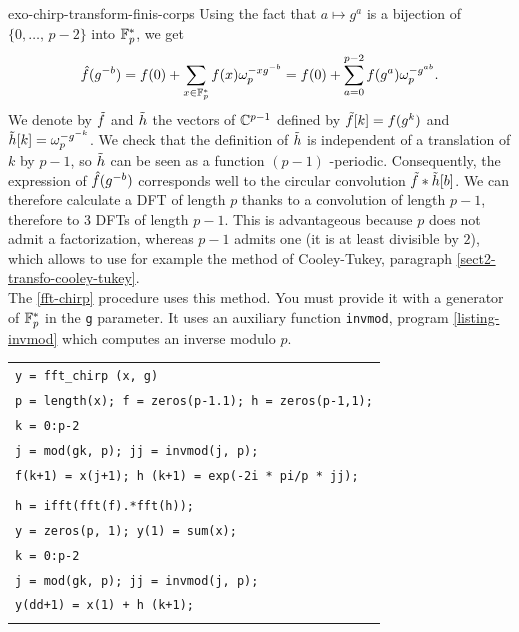  
\begin{correction}{exo-chirp-transform-finis-corps}
 Using the fact that $ a \mapsto g^a $ is a bijection of $ \{0, \ldots, \, p-2\} $ into $ \mathbb{F}_p^* $, we get
\begin{equation*}
\hat{f} (g^{- b}) = f(0) + \sum_{x \in \mathbb{F}_p^*}{f(x) \omega_p^{- xg^{- b}}} = f(0) + \sum_{a = 0}^{p-2}{f(g^a) \omega_p^{-g^{ab}}}.
\end{equation*}
  We denote by $ \tilde{f} $ and $ \tilde{h} $ the vectors of $ \mathbb{C}^{p-1} $ defined by $ \tilde{f}[k] = f(g^{k}) $ and $ \tilde{h}[k] = \omega_p^{- g^{- k}} $. We check that the definition of $ \tilde{h} $ is independent of a translation of $ k $ by $ p-1 $, so $ \tilde{h} $ can be seen as a function $ (p-1) $ -periodic. Consequently, the expression of $ \hat{f} (g^{- b}) $ corresponds well to the circular convolution $ \tilde{f} * \tilde{h}[b] $. We can therefore calculate a DFT of length $ p $ thanks to a convolution of length $ p-1 $, therefore to 3 DFTs of length $ p-1 $. This is advantageous because $ p $ does not admit a factorization, whereas $ p-1 $ admits one (it is at least divisible by $ 2 $), which allows to use for example the method of Cooley-Tukey, paragraph \ref{sect2-transfo-cooley-tukey}. \\The \Matlab{} \ref{fft-chirp} procedure uses this method. You must provide it with a generator of $ \mathbb{F}_p^* $ in the \texttt{g} parameter. It uses an auxiliary function \texttt{invmod}, program \ref{listing-invmod} which computes an inverse modulo $ p $.

\begin{listing} 
\begin{footnotesize} 
{\upshape
\begin{tabular}{l} \texttt{\pfunction y = fft\_chirp (x, g)} \\
\texttt{p = length(x); f = zeros(p-1.1); h = zeros(p-1,1);} \\
\texttt{\pfor k = 0:p-2} \\
\quad \texttt{j = mod(g{\hatverb}k, p); jj = invmod(j, p);} \\
\quad \texttt{f(k+1) = x(j+1); h (k+1) = exp(-2i * pi/p * jj);} \\
\texttt{\pend} \\
\texttt{h = ifft(fft(f).*fft(h));} \\
\texttt{y = zeros(p, 1); y(1) = sum(x);} \\
\texttt{\pfor k = 0:p-2} \\
\quad \texttt{j = mod(g{\hatverb}k, p); jj = invmod(j, p);} \\
\quad \texttt{y(dd+1) = x(1) + h (k+1);} \\
\texttt{\pend} \\
\end{tabular}
}
\end{footnotesize}
\caption{Procedure \texttt{\upshape fft\_chirp}}
\label{fft-chirp}
\end{listing}
 

\end{correction}
